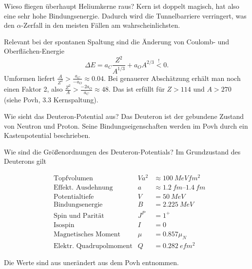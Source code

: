 
\begin{fquestion}{Wieso fliegen überhaupt Heliumkerne raus?}
    Kern ist doppelt magisch, hat also eine sehr hohe Bindungsenergie.
    Dadurch wird die Tunnelbarriere verringert, was den $\alpha$-Zerfall in den meisten Fällen am wahrscheinlichsten.
    
    Relevant bei der spontanen Spaltung sind die Änderung von Coulomb- und Oberflächen-Energie
    $$\Delta E = a_C \frac{Z^2}{A^{1/3}} + a_O A^{2/3} \overset{!}{<} 0.$$
    Umformen liefert $\frac{A}{Z^2} > \frac{a_C}{-a_O} \approx 0.04$.
    Bei genauerer Abschätzung erhält man noch einen Faktor 2, also $\frac{Z^2}{A} > \frac{-2a_O}{a_C} \approx 48$.
    Das ist erfüllt für $Z>114$ und $A> 270$ (siehe Povh, 3.3 Kernspaltung).
\end{fquestion}

\begin{fquestion}{Wie sieht das Deuteron-Potential aus?}
    Das Deuteron ist der gebundene Zustand von Neutron und Proton.
    Seine Bindungseigenschaften werden im Povh durch ein Kastenpotential beschrieben.
\end{fquestion}


\begin{fquestion}{Wie sind die Größenordnungen des Deuteron-Potentials?}
    Im Grundzustand des Deuterons gilt
    
    $$\begin{aligned}
        & \text{Topfvolumen} & Va^2 &\approx \SI{100}{MeV fm^2} \\
        & \text{Effekt. Ausdehnung} & a &\approx \SIrange{1.2}{1.4}{fm} \\
        & \text{Potentialtiefe} & V &= \SI{50}{MeV} \\
         &\text{Bindungsenergie} &  B &=\SI{2.225}{MeV} \\
        &\text{Spin und Parität} & J^P &= 1^+ \\
        &\text{Isospin} & I &= 0 \\
        &\text{Magnetisches Moment} & \mu &= 0.857 \mu_N \\
        &\text{Elektr. Quadrupolmoment} & Q&=\SI{0.282}{e fm^2}
    \end{aligned}$$
    
    Die Werte sind aus unerändert aus dem Povh entnommen.
\end{fquestion}

